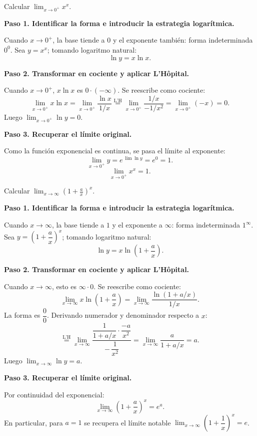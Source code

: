 \begin{example}
Calcular $\displaystyle\lim_{x\to 0^+}x^x$.
\begin{myproof}
\textbf{Paso 1. Identificar la forma e introducir la estrategia logarítmica.}

Cuando $x\to 0^+$, la base tiende a $0$ y el exponente también: forma
indeterminada $0^0$. Sea $y=x^x$; tomando logaritmo natural:
\[
\ln y = x\ln x.
\]

\textbf{Paso 2. Transformar en cociente y aplicar L'Hôpital.}

Cuando $x\to 0^+$, $x\ln x$ es $0\cdot(-\infty)$. Se reescribe como cociente:
\[
\lim_{x\to 0^+} x\ln x
= \lim_{x\to 0^+}\frac{\ln x}{1/x}
\overset{\text{L'H}}{=}
\lim_{x\to 0^+}\frac{1/x}{-1/x^2}
= \lim_{x\to 0^+}(-x) = 0.
\]
Luego $\lim_{x\to 0^+}\ln y = 0$.

\textbf{Paso 3. Recuperar el límite original.}

Como la función exponencial es continua, se pasa el límite al exponente:
\[
\lim_{x\to 0^+} y = e^{\,\lim\ln y} = e^0 = 1.
\]
\[
\boxed{\lim_{x\to 0^+}x^x = 1.}
\]
\end{myproof}
\end{example}

\begin{example}
Calcular $\displaystyle\lim_{x\to\infty}\!\left(1+\frac{a}{x}\right)^{\!x}$.
\begin{myproof}
\textbf{Paso 1. Identificar la forma e introducir la estrategia logarítmica.}

Cuando $x\to\infty$, la base tiende a $1$ y el exponente a $\infty$:
forma indeterminada $1^\infty$. Sea $y=\!\left(1+\dfrac{a}{x}\right)^{\!x}$;
tomando logaritmo natural:
\[
\ln y = x\ln\!\left(1+\frac{a}{x}\right).
\]

\textbf{Paso 2. Transformar en cociente y aplicar L'Hôpital.}

Cuando $x\to\infty$, esto es $\infty\cdot 0$. Se reescribe como cociente:
\[
\lim_{x\to\infty} x\ln\!\left(1+\frac{a}{x}\right)
= \lim_{x\to\infty}\frac{\ln(1+a/x)}{1/x}.
\]
La forma es $\dfrac{0}{0}$. Derivando numerador y denominador respecto a $x$:
\[
\overset{\text{L'H}}{=}
\lim_{x\to\infty}
\frac{\dfrac{1}{1+a/x}\cdot\dfrac{-a}{x^2}}{-\,\dfrac{1}{x^2}}
= \lim_{x\to\infty}\frac{a}{1+a/x}
= a.
\]
Luego $\lim_{x\to\infty}\ln y = a$.

\textbf{Paso 3. Recuperar el límite original.}

Por continuidad del exponencial:
\[
\boxed{\lim_{x\to\infty}\!\left(1+\frac{a}{x}\right)^{\!x} = e^a.}
\]
En particular, para $a=1$ se recupera el límite notable
$\lim_{x\to\infty}\!\left(1+\dfrac{1}{x}\right)^{\!x}=e$.
\end{myproof}
\end{example}

